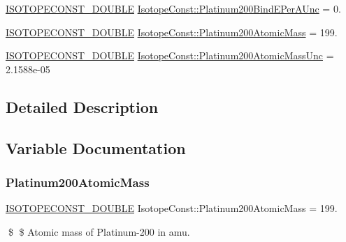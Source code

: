 \begin{DoxyCompactItemize}
\mbox{\hyperlink{group___isotope_const-_macros_ga8f45a7272ce02c0b4c65c44636ed719a}{I\+S\+O\+T\+O\+P\+E\+C\+O\+N\+S\+T\+\_\+\+D\+O\+U\+B\+LE}} \mbox{\hyperlink{group___isotope_const-_platinum-_pt200_gac70949103cf44ebb228495dafdc00476}{Isotope\+Const\+::\+Platinum200\+Bind\+E\+Per\+A\+Unc}} = 0.
\item 
\mbox{\hyperlink{group___isotope_const-_macros_ga8f45a7272ce02c0b4c65c44636ed719a}{I\+S\+O\+T\+O\+P\+E\+C\+O\+N\+S\+T\+\_\+\+D\+O\+U\+B\+LE}} \mbox{\hyperlink{group___isotope_const-_platinum-_pt200_ga19efed816f31613b64340f4c8b01dbb5}{Isotope\+Const\+::\+Platinum200\+Atomic\+Mass}} = 199.
\item 
\mbox{\hyperlink{group___isotope_const-_macros_ga8f45a7272ce02c0b4c65c44636ed719a}{I\+S\+O\+T\+O\+P\+E\+C\+O\+N\+S\+T\+\_\+\+D\+O\+U\+B\+LE}} \mbox{\hyperlink{group___isotope_const-_platinum-_pt200_gaa7740ac28fb69b1647975ca7a8ef387b}{Isotope\+Const\+::\+Platinum200\+Atomic\+Mass\+Unc}} = 2.\+1588e-\/05
\end{DoxyCompactItemize}


\subsection{Detailed Description}


\subsection{Variable Documentation}
\mbox{\label{group___isotope_const-_platinum-_pt200_ga19efed816f31613b64340f4c8b01dbb5}} 
\subsubsection{\texorpdfstring{Platinum200\+Atomic\+Mass}{Platinum200AtomicMass}}
{\footnotesize\ttfamily \mbox{\hyperlink{group___isotope_const-_macros_ga8f45a7272ce02c0b4c65c44636ed719a}{I\+S\+O\+T\+O\+P\+E\+C\+O\+N\+S\+T\+\_\+\+D\+O\+U\+B\+LE}} Isotope\+Const\+::\+Platinum200\+Atomic\+Mass = 199.}

\$ \$ Atomic mass of Platinum-\/200 in amu. \mbox{\label{group___isotope_const-_platinum-_pt200_gaa7740ac28fb69b1647975ca7a8ef387b}} 
